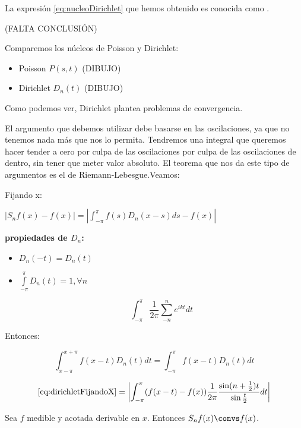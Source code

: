 		La expresión \ref{eq:nucleoDirichlet} que hemos obtenido es conocida como .

		(FALTA CONCLUSIÓN)




	Comparemos los núcleos de Poisson y Dirichlet:

	\begin{itemize}

		\item Poisson $P(s,t)$ (DIBUJO)

		\item Dirichlet $D_n(t)$ (DIBUJO)

	\end{itemize}

	Como podemos ver, Dirichlet plantea problemas de convergencia.

	El argumento que debemos utilizar debe basarse en las oscilaciones, ya que no tenemos nada más que nos lo permita. Tendremos una integral que queremos hacer tender a cero por culpa de las oscilaciones por culpa de las oscilaciones de dentro, sin tener que meter valor absoluto. El teorema que nos da este tipo de argumentos es el de Riemann-Lebesgue.Veamos:

	Fijando x:

	\( |S_n f(x) - f(x) | = \left| \int_{-\pi}^\pi f(s) D_n (x-s) ds - f(x) \right| \label{eq:dirichletFijandoX} \)

	\textbf{propiedades de $D_n$:}

	\begin{itemize}
		\item $D_n(-t) = D_n(t)$

		\item $\int\limits_{-\pi}^{\pi} D_n(t) = 1, \forall n $

		\[ \int_{-\pi}^\pi  \frac{1}{2\pi} \sum_{-n}^{n} e^{ikt} dt \]

	\end{itemize}


	Entonces:

	\[  \int_{x-\pi}^{x +\pi} f(x-t) D_n(t) dt = \int^{\pi}_{-\pi} f(x-t) D_n(t) dt \]

	\[ \eqref{eq:dirichletFijandoX} = \left| \int_{-\pi}^\pi (f(x-t)-f(x)) \frac{1}{2\pi} \frac{\sin(n+\frac{1}{2})t}{\sin{\frac{t}{2}}} dt \right| \]


	\begin{theorem}[Dirichlet 1]

		Sea $f$ medible y acotada derivable en $x$. Entonces $S_n f(x) \convs f(x)$.

	\end{theorem}

